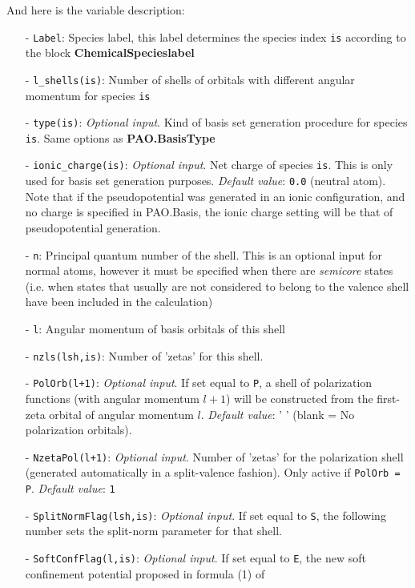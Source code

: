 \documentclass[11pt]{article}
\begin{document}
\begin{description}
\noindent
And here is the variable description:
\begin{itemize}
\item[-] {\tt Label}: Species label, this label determines 
the species index {\tt is} according to the block {\bf ChemicalSpecieslabel}
\item[-] {\tt l\_shells(is)}: Number of shells of orbitals 
with different angular momentum for species {\tt is}  
\item[-] {\tt type(is)}: {\it Optional input}.
Kind of basis set generation procedure for species {\tt is}. 
Same options as {\bf PAO.BasisType}
\item[-] {\tt ionic\_charge(is)}: {\it Optional input}. 
Net charge of species {\tt is}. This is  only used for
basis set generation purposes. {\it Default value}: {\tt 0.0} (neutral
atom). Note that if the pseudopotential was generated in an ionic
configuration, and no charge is specified in PAO.Basis, the ionic
charge setting will be that of pseudopotential generation.
\item[-] {\tt n}: Principal quantum number of the shell. This is an optional 
input for normal atoms, however it must be specified when there are
{\it semicore} states (i.e. when states that usually are not 
considered to belong to the 
valence shell have been included in the calculation)
\item[-] {\tt l}: Angular momentum of 
basis orbitals of this shell
\item[-] {\tt nzls(lsh,is)}: Number of 'zetas' for this shell.
\item[-] {\tt PolOrb(l+1)}: {\it Optional input}. If set equal to {\tt P}, a 
shell of  
polarization functions (with angular momentum $l+1$)  will be constructed 
from the first-zeta orbital of angular momentum $l$. {\it Default value}: ' ' 
(blank = No polarization orbitals). 
\item[-] {\tt NzetaPol(l+1)}: {\it Optional input}. Number of
'zetas' for the 
polarization shell (generated automatically in a split-valence fashion). 
Only active if {\tt PolOrb = P}. {\it Default value}: {\tt 1} 
\item[-] {\tt SplitNormFlag(lsh,is)}:
{\it Optional input}. If set equal to 
{\tt S}, the following number sets the split-norm parameter for that shell.
\item[-] {\tt SoftConfFlag(l,is)}:
{\it Optional input}. If set equal to 
{\tt E}, the new soft confinement potential proposed in formula (1) of

\end{itemize}
\end{description}
\end{document}
